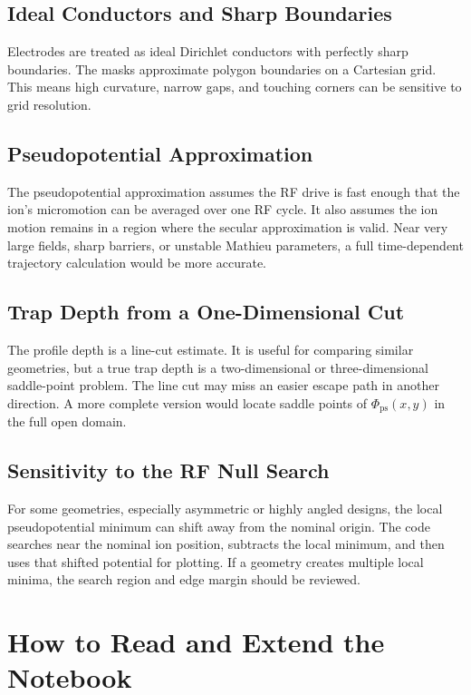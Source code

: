 \documentclass[11pt]{article}
\begin{document}
\subsection{Ideal Conductors and Sharp Boundaries}

Electrodes are treated as ideal Dirichlet conductors with perfectly sharp
boundaries. The masks approximate polygon boundaries on a Cartesian grid. This
means high curvature, narrow gaps, and touching corners can be sensitive to
grid resolution.

\subsection{Pseudopotential Approximation}

The pseudopotential approximation assumes the RF drive is fast enough that the
ion's micromotion can be averaged over one RF cycle. It also assumes the ion
motion remains in a region where the secular approximation is valid. Near very
large fields, sharp barriers, or unstable Mathieu parameters, a full
time-dependent trajectory calculation would be more accurate.

\subsection{Trap Depth from a One-Dimensional Cut}

The profile depth is a line-cut estimate. It is useful for comparing similar
geometries, but a true trap depth is a two-dimensional or three-dimensional
saddle-point problem. The line cut may miss an easier escape path in another
direction. A more complete version would locate saddle points of
\(\Phi_{\mathrm{ps}}(x,y)\) in the full open domain.

\subsection{Sensitivity to the RF Null Search}

For some geometries, especially asymmetric or highly angled designs, the local
pseudopotential minimum can shift away from the nominal origin. The code
searches near the nominal ion position, subtracts the local minimum, and then
uses that shifted potential for plotting. If a geometry creates multiple local
minima, the search region and edge margin should be reviewed.

\newpage

\section{How to Read and Extend the Notebook}
\end{document}
